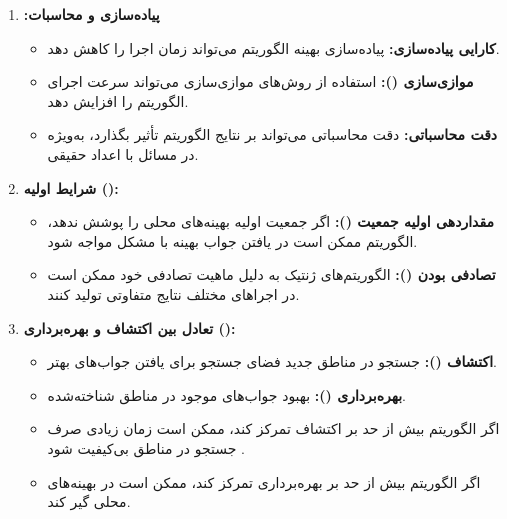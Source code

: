 \documentclass[12pt]{exam}
\begin{document}
\begin{questions}
\begin{parts}
\begin{enumerate}
\begin{itemize}
	 \end{itemize}
	 
	 \item \textbf{:پیاده‌سازی و محاسبات}
	 
	 \begin{itemize}
	 	\item \textbf{کارایی پیاده‌سازی: }
	 	پیاده‌سازی بهینه الگوریتم می‌تواند زمان اجرا را کاهش دهد.
	 	\item \textbf{موازی‌سازی (): }
	 	استفاده از روش‌های موازی‌سازی می‌تواند سرعت اجرای الگوریتم را افزایش دهد.
	 	\item \textbf{دقت محاسباتی: }
	 	دقت محاسباتی می‌تواند بر نتایج الگوریتم تأثیر بگذارد، به‌ویژه در مسائل با اعداد حقیقی.
	 \end{itemize}
	 
	 \item \textbf{شرایط اولیه ():}
	 
	 \begin{itemize}
	 	\item \textbf{مقداردهی اولیه جمعیت (): }
	 	اگر جمعیت اولیه بهینه‌های محلی را پوشش ندهد، الگوریتم ممکن است در یافتن جواب بهینه با مشکل مواجه شود.
	 	
	 	\item \textbf{تصادفی بودن (): }
	 	الگوریتم‌های ژنتیک به دلیل ماهیت تصادفی خود ممکن است در اجراهای مختلف نتایج متفاوتی تولید کنند.
	 	
	 \end{itemize}
	 
	 \item \textbf{تعادل بین اکتشاف و بهره‌برداری ():}
	 
	 
	\begin{itemize}
		\item \textbf{اکتشاف ():}
		جستجو در مناطق جدید فضای جستجو برای یافتن جواب‌های بهتر.
		
		\item \textbf{بهره‌برداری ():}
		بهبود جواب‌های موجود در مناطق شناخته‌شده.
		
		\item 	اگر الگوریتم بیش از حد بر اکتشاف تمرکز کند، ممکن است زمان زیادی صرف جستجو در مناطق بی‌کیفیت شود
		.
		\item اگر الگوریتم بیش از حد بر بهره‌برداری تمرکز کند، ممکن است در بهینه‌های محلی گیر کند.
		
	\end{itemize}
	

\end{enumerate}
\end{parts}
\end{questions}
\end{document}
